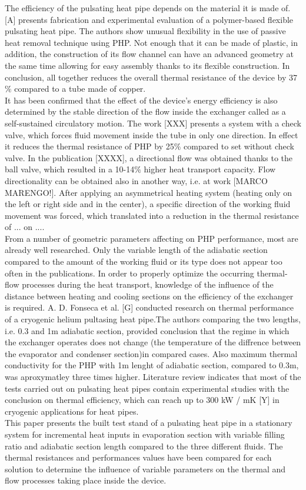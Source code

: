 \documentclass[article]{elsarticle}
\begin{document}
The efficiency of the pulsating heat pipe depends on the material it is made of. [A] presents fabrication and experimental evaluation of a polymer-based flexible pulsating heat pipe. The authors show unusual flexibility in the use of passive heat removal technique using PHP. Not enough that it can be made of plastic, in addition, the construction of its flow channel can have an advanced geometry at the same time allowing for easy assembly thanks to its flexible construction. In conclusion, all together reduces the overall thermal resistance of the device by 37$\%$ compared to a tube made of copper.\\
It has been confirmed that the effect of the device's energy efficiency is also determined by the stable direction of the flow inside the exchanger called as a self-sustained circulatory motion. The work [XXX] presents a system with a check valve, which forces fluid movement inside the tube in only one direction. In effect it reduces the thermal resistance of PHP by 25$\%$ compared to set without check valve. In the publication [XXXX], a directional flow was obtained thanks to the ball valve, which resulted in a 10-14$\%$ higher heat transport capacity. Flow directionality can be obtained also in another way, i.e. at work [MARCO MARENGO!]. After applying an asymmetrical heating system (heating only on the left or right side and in the center), a specific direction of the working fluid movement was forced, which translated into a reduction in the thermal resistance of ... on ....\\
From a number of geometric parameters affecting on PHP performance, most are already well researched. Only the variable length of the adiabatic section compared to the amount of the working fluid or its type does not appear too often in the publications. In order to properly optimize the occurring thermal-flow processes during the heat transport, knowledge of the influence of the distance between heating and cooling sections on the efficiency of the exchanger is required. A. D. Fonseca et al. [G] conducted research on thermal performance of a cryogenic helium pultasing heat pipe.The authors comparing the two lengths, i.e. 0.3 and 1m adiabatic section, provided conclusion that the regime in which the exchanger operates does not change (the temperature of the diffrence between the evaporator and condenser section)in compared cases. Also maximum thermal conductivity for the PHP with 1m lenght of adiabatic section, compared to 0.3m, was aproxymatley three times higher. Literature review indicates that most of the tests carried out on pulsating heat pipes contain experimental studies with the conclusion on thermal efficiency, which can reach up to 300 kW / mK [Y] in cryogenic applications for heat pipes.\\
This paper presents the built test stand of a pulsating heat pipe in a stationary system for incremental heat inputs in evaporation section with variable filling ratio and adiabatic section length compared to the three different fluids. The thermal resistances and performances values have been compared for each solution to determine the influence of variable parameters on the thermal and flow processes taking place inside the device.
\end{document}
